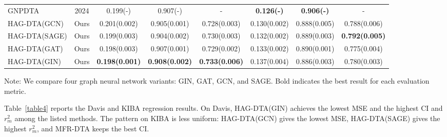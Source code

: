 \documentclass[pdflatex,sn-mathphys-num]{sn-jnl}%
\theoremstyle{thmstyleone}%
\theoremstyle{thmstyletwo}%
\theoremstyle{thmstylethree}%
\begin{document}
\begin{table}[ht]
\begin{tabular*}{\textwidth}{@{\extracolsep{\fill}}lccccccc@{}}
GNPDTA\cite{ye2024graphpre}              & 2024 & 0.199(-)           & 0.907(-)              & \multicolumn{1}{c}{-} & \textbf{0.126(-)}             & \textbf{0.906(-)} & \multicolumn{1}{c}{-} \\
HAG-DTA(GCN)                             & Ours & 0.201(0.002)          & 0.905(0.001)          & 0.728(0.003)          & 0.130(0.002) & 0.888(0.005)          & 0.788(0.006)          \\
HAG-DTA(SAGE)                            & Ours & 0.199(0.003)          & 0.904(0.002)          & 0.730(0.003)          & 0.132(0.002)          & 0.889(0.003)          & \textbf{0.792(0.005)} \\
HAG-DTA(GAT)                             & Ours & 0.198(0.003)          & 0.907(0.001)          & 0.729(0.002)          & 0.133(0.002)          & 0.890(0.001)          & 0.775(0.004)          \\
HAG-DTA(GIN)                             & Ours & \textbf{0.198(0.001)} & \textbf{0.908(0.002)} & \textbf{0.733(0.006)} & 0.137(0.004)          & 0.886(0.003)          & 0.780(0.003)          \\
\bottomrule
\end{tabular*}
\begin{tablenotes}
\item Note: We compare four graph neural network variants: GIN, GAT, GCN, and SAGE. Bold indicates the best result for each evaluation metric.
\end{tablenotes}
\end{table}

Table~\ref{table4} reports the Davis and KIBA regression results. On Davis, HAG-DTA(GIN) achieves the lowest MSE and the highest CI and $r_m^2$ among the listed methods. The pattern on KIBA is less uniform: HAG-DTA(GCN) gives the lowest MSE, HAG-DTA(SAGE) gives the highest $r_m^2$, and MFR-DTA keeps the best CI. 
\end{document}
